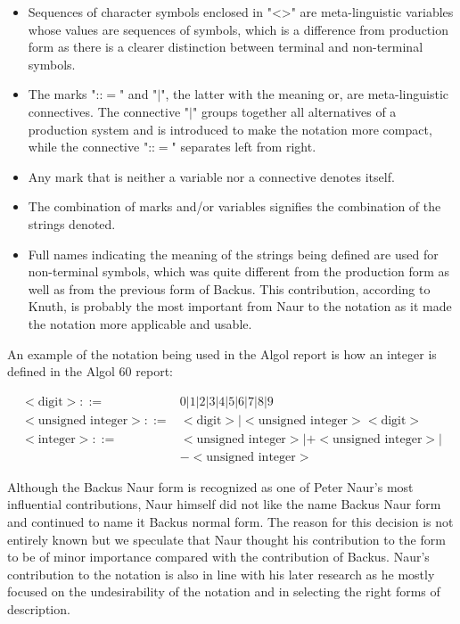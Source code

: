 \documentclass{article}
\begin{document}
\begin{itemize}
	\item Sequences of character symbols enclosed in "<>" are meta-linguistic variables whose values are sequences of symbols, which is a difference from production form as there is a clearer distinction between terminal and non-terminal symbols.
	\item The marks "::$=$" and "$|$", the latter with the meaning or, are meta-linguistic connectives. The connective "$|$" groups together all alternatives of a production system and is introduced to make the notation more compact, while the connective "::$=$" separates left from right.
	\item Any mark that is neither a variable nor a connective denotes itself.
	\item The combination of marks and/or variables signifies the combination of the strings denoted.
	\item Full names indicating the meaning of the strings being defined are used for non-terminal symbols, which was quite different from the production form as well as from the previous form of Backus. This contribution, according to Knuth, is probably the most important from Naur to the notation as it made the notation more applicable and usable.
\end{itemize}

An example of the notation being used in the Algol report is how an integer is defined in the Algol 60 report:

\begin{equation} \label{eq3}
	\begin{split}
	<\text{digit}> ::=&0|1|2|3|4|5|6|7|8|9 \\
	<\text{unsigned integer}> ::=&<\text{digit}>|<\text{unsigned integer}><\text{digit}> \\
	<\text{integer}> ::=&<\text{unsigned integer}>|+<\text{unsigned integer}>|\\&-<\text{unsigned integer}>
	\end{split}
\end{equation}

Although the Backus Naur form is recognized as one of Peter Naur's most influential contributions, Naur himself did not like the name Backus Naur form and continued to name it Backus normal form. The reason for this decision is not entirely known but we speculate that Naur thought his contribution to the form to be of minor importance compared with the contribution of Backus. Naur's contribution to the notation is also in line with his later research as he mostly focused on the undesirability of the notation and in selecting the right forms of description. 
\end{document}
